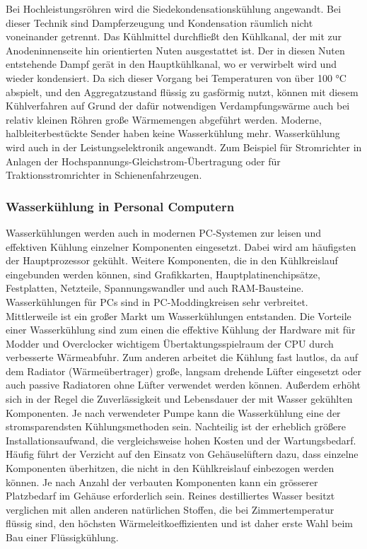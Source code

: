 Bei Hochleistungsröhren wird die Siedekondensationskühlung angewandt. Bei dieser Technik sind Dampferzeugung und Kondensation räumlich nicht voneinander getrennt. Das Kühlmittel durchfließt den Kühlkanal, der mit zur Anodeninnenseite hin orientierten Nuten ausgestattet ist. Der in diesen Nuten entstehende Dampf gerät in den Hauptkühlkanal, wo er verwirbelt wird und wieder kondensiert. Da sich dieser Vorgang bei Temperaturen von über 100 °C abspielt, und den Aggregatzustand flüssig zu gasförmig nutzt, können mit diesem Kühlverfahren auf Grund der dafür notwendigen Verdampfungswärme auch bei relativ kleinen Röhren große Wärmemengen abgeführt werden.
Moderne, halbleiterbestückte Sender haben keine Wasserkühlung mehr.
Wasserkühlung wird auch in der Leistungselektronik angewandt. Zum Beispiel für Stromrichter in Anlagen der Hochspannungs-Gleichstrom-Übertragung oder für Traktionsstromrichter in Schienenfahrzeugen.


\subsubsection{Wasserkühlung in Personal Computern}

Wasserkühlungen werden auch in modernen PC-Systemen zur leisen und effektiven Kühlung einzelner Komponenten eingesetzt. Dabei wird am häufigsten der Hauptprozessor gekühlt. Weitere Komponenten, die in den Kühlkreislauf eingebunden werden können, sind Grafikkarten, Hauptplatinen­chipsätze, Festplatten, Netzteile, Spannungswandler und auch RAM-Bausteine.
Wasserkühlungen für PCs sind in PC-Moddingkreisen sehr verbreitet. Mittlerweile ist ein großer Markt um Wasserkühlungen entstanden.
Die Vorteile einer Wasserkühlung sind zum einen die effektive Kühlung der Hardware mit für Modder und Overclocker wichtigem Übertaktungsspielraum der CPU durch verbesserte Wärmeabfuhr. Zum anderen arbeitet die Kühlung fast lautlos, da auf dem Radiator (Wärmeübertrager) große, langsam drehende Lüfter eingesetzt oder auch passive Radiatoren ohne Lüfter verwendet werden können. Außerdem erhöht sich in der Regel die Zuverlässigkeit und Lebensdauer der mit Wasser gekühlten Komponenten. Je nach verwendeter Pumpe kann die Wasserkühlung eine der stromsparendsten Kühlungsmethoden sein.
Nachteilig ist der erheblich größere Installationsaufwand, die vergleichsweise hohen Kosten und der Wartungsbedarf. Häufig führt der Verzicht auf den Einsatz von Gehäuselüftern dazu, dass einzelne Komponenten überhitzen, die nicht in den Kühlkreislauf einbezogen werden können. Je nach Anzahl der verbauten Komponenten kann ein grösserer Platzbedarf im Gehäuse erforderlich sein.
Reines destilliertes Wasser besitzt verglichen mit allen anderen natürlichen Stoffen, die bei Zimmertemperatur flüssig sind, den höchsten Wärmeleitkoeffizienten und ist daher erste Wahl beim Bau einer Flüssigkühlung.

